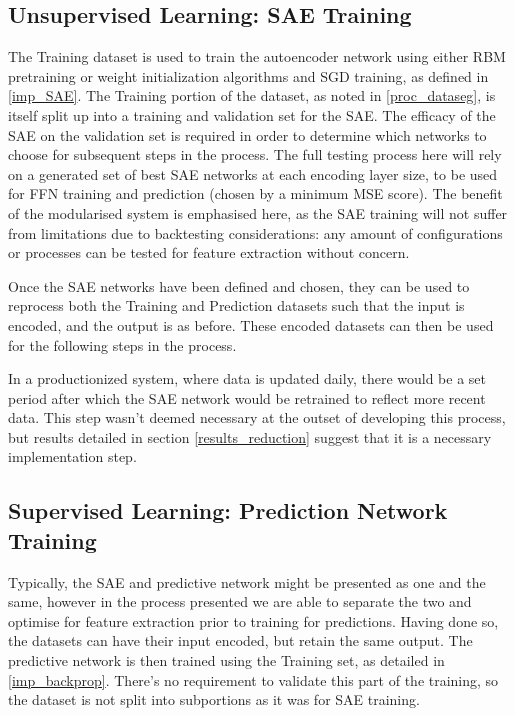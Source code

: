 \documentclass[a4paper,11pt,oneside]{article}
\theoremstyle{plain}
\theoremstyle{definition}
\begin{document}
	\subsection{Unsupervised Learning: SAE Training}\label{proc_sae}
	
	The Training dataset is used to train the autoencoder network using either RBM pretraining or weight initialization algorithms and SGD training, as defined in \ref{imp_SAE}. The Training portion of the dataset, as noted in \ref{proc_dataseg}, is itself split up into a training and validation set for the SAE. The efficacy of the SAE on the validation set is required in order to determine which networks to choose for subsequent steps in the process. The full testing process here will rely on a generated set of best SAE networks at each encoding layer size, to be used for FFN training and prediction (chosen by a minimum MSE score). The benefit of the modularised system is emphasised here, as the SAE training will not suffer from limitations due to backtesting considerations: any amount of configurations or processes can be tested for feature extraction without concern. \newline
	
	Once the SAE networks have been defined and chosen, they can be used to reprocess both the Training and Prediction datasets such that the input is encoded, and the output is as before. These encoded datasets can then be used for the following steps in the process. \newline
	
	In a productionized system, where data is updated daily, there would be a set period after which the SAE network would be retrained to reflect more recent data. This step wasn't deemed necessary at the outset of developing this process, but results detailed in section \ref{results_reduction} suggest that it is a necessary implementation step.\newline
	
	\subsection{Supervised Learning: Prediction Network Training}\label{proc_predictionnetwork}
	
	Typically, the SAE and predictive network might be presented as one and the same, however in the process presented we are able to separate the two and optimise for feature extraction prior to training for predictions. Having done so, the datasets can have their input encoded, but retain the same output. The predictive network is then trained using the Training set, as detailed in \ref{imp_backprop}. There's no requirement to validate this part of the training, so the dataset is not split into subportions as it was for SAE training. \newline
	
\end{document}
